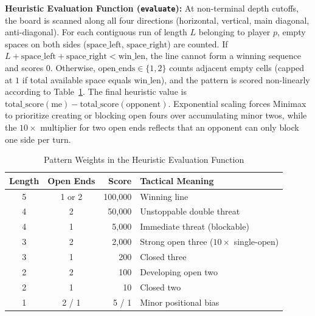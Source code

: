 \documentclass[conference]{IEEEtran}
\begin{document}
\textbf{Heuristic Evaluation Function (\texttt{evaluate}):} At non-terminal depth cutoffs, the board is scanned along all four directions (horizontal, vertical, main diagonal, anti-diagonal). For each contiguous run of length $L$ belonging to player $p$, empty spaces on both sides ($\text{space\_left}$, $\text{space\_right}$) are counted. If $L + \text{space\_left} + \text{space\_right} < \text{win\_len}$, the line cannot form a winning sequence and scores $0$. Otherwise, $\text{open\_ends} \in \{1, 2\}$ counts adjacent empty cells (capped at $1$ if total available space equals $\text{win\_len}$), and the pattern is scored non-linearly according to Table~\ref{tab:eval_weights}. The final heuristic value is $\text{total\_score}(\text{me}) - \text{total\_score}(\text{opponent})$. Exponential scaling forces Minimax to prioritize creating or blocking open fours over accumulating minor twos, while the $10\times$ multiplier for two open ends reflects that an opponent can only block one side per turn.

\begin{table}[t]
\centering
\caption{Pattern Weights in the Heuristic Evaluation Function}
\label{tab:eval_weights}
\begin{tabular}{@{}ccrl@{}}
\toprule
Length & Open Ends & Score & Tactical Meaning \\
\midrule
5 & 1 or 2 & 100,000 & Winning line \\
4 & 2 & 50,000 & Unstoppable double threat \\
4 & 1 & 5,000 & Immediate threat (blockable) \\
3 & 2 & 2,000 & Strong open three ($10\times$ single-open) \\
3 & 1 & 200 & Closed three \\
2 & 2 & 100 & Developing open two \\
2 & 1 & 10 & Closed two \\
1 & 2 / 1 & 5 / 1 & Minor positional bias \\
\bottomrule
\end{tabular}
\end{table}
\end{document}
